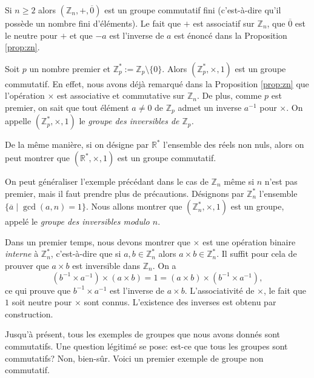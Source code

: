 \documentclass[french,course,oneside,theoremnosection]{lecture}
\newcommand{\R}{\mathbb{R}}
\newcommand{\Z}{\mathbb{Z}}
\begin{document}
\begin{example}
Si $n\geq 2$ alors $(\Z_n, +, \overline{0})$ est un groupe commutatif fini (c'est-à-dire qu'il possède un nombre fini d'éléments). Le fait que $+$ est associatif sur $\Z_n$, que $\overline{0}$ est le neutre pour $+$ et que $-a$ est l'inverse de $a$ est énoncé dans la Proposition \ref{prop:zn}.
\end{example}

\begin{example}
Soit $p$ un nombre premier et $\Z_p^*:=\Z_p\setminus \{0\}$. Alors $(\Z_p^*, \times, 1)$ est un groupe commutatif. En effet, nous avons déjà remarqué dans la Proposition \ref{prop:zn} que l'opération $\times$ est associative et commutative sur $\Z_n$. De plus, comme $p$ est premier, on sait que tout élément $a\neq 0$ de $\Z_p$ admet un inverse $a^{-1}$ pour $\times$. On appelle $(\Z_p^*, \times, 1)$ le \emph{groupe des inversibles de $\Z_p$.} 

De la même manière, si on désigne par $\R^*$ l'ensemble des réels non nuls, alors on peut montrer que $(\R^*, \times, 1)$ est un groupe commutatif.
\end{example}

\begin{example}
On peut généraliser l'exemple précédant dans le cas de $\Z_n$ même si $n$ n'est pas premier, mais il faut prendre plus de précautions. Désignons par $\Z_n^*$ l'ensemble $\{\overline{a} \mid \gcd(a, n) =1\}$. Nous allons montrer que $(\Z_n^*, \times,  1)$ est un groupe, appelé le \emph{groupe des inversibles modulo $n$}.

Dans un premier temps, nous devons montrer que $\times$ est une opération binaire \emph{interne} à $\Z_n^*$, c'est-à-dire que si ${a},b \in \Z_n^*$ alors $a\times b \in \Z_n^*$. Il suffit pour cela de prouver que $a\times b$ est inversible dans $\Z_n$. On a
\[
(b^{-1} \times a^{-1})\times (a \times b) = 1 =(a \times b) \times (b^{-1} \times a^{-1}), 
\]
ce qui prouve que $b^{-1}\times a^{-1}$ est l'inverse de $a \times b$. L'associativité de $\times$, le fait que $1$ soit neutre pour $\times$ sont connus. L'existence des inverses est obtenu par construction.
\end{example}

Jusqu'à présent, tous les exemples de groupes que nous avons donnés sont commutatifs. Une question légitimé se pose: est-ce que tous les groupes sont commutatifs? Non, bien-sûr. Voici un premier exemple de groupe non commutatif.
\end{document}

